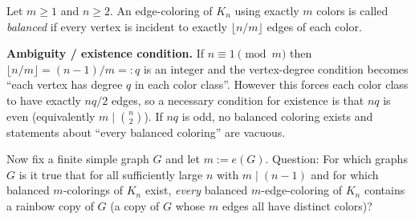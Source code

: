 Let $m\ge 1$ and $n\ge 2$.
An edge-coloring of $K_n$ using exactly $m$ colors is called \emph{balanced} if every vertex is incident to exactly $\lfloor n/m\rfloor$ edges of each color.

\textbf{Ambiguity / existence condition.} If $n\equiv 1\pmod m$ then $\lfloor n/m\rfloor=(n-1)/m=:q$ is an integer and the vertex-degree condition becomes ``each vertex has degree $q$ in each color class''. However this forces each color class to have exactly $nq/2$ edges, so a necessary condition for existence is that $nq$ is even (equivalently $m\mid \binom{n}{2}$). If $nq$ is odd, no balanced coloring exists and statements about ``every balanced coloring'' are vacuous.

\smallskip
Now fix a finite simple graph $G$ and let $m:=e(G)$.
Question: For which graphs $G$ is it true that for all sufficiently large $n$ with $m\mid (n-1)$ and for which balanced $m$-colorings of $K_n$ exist, \emph{every} balanced $m$-edge-coloring of $K_n$ contains a rainbow copy of $G$ (a copy of $G$ whose $m$ edges all have distinct colors)?
